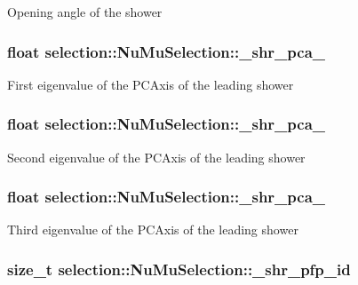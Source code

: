 Opening angle of the shower \hypertarget{classselection_1_1NuMuSelection_a60e7ec002826c7bc6f31739a1f06d67a}{
\subsubsection[{\-\_\-shr\-\_\-pca\-\_\-0}]{\setlength{\rightskip}{0pt plus 5cm}float selection\-::\-Nu\-Mu\-Selection\-::\-\_\-shr\-\_\-pca\-\_\hspace{0.3cm}{\ttfamily [private]}}}\label{classselection_1_1NuMuSelection_a60e7ec002826c7bc6f31739a1f06d67a}
First eigenvalue of the P\-C\-Axis of the leading shower \hypertarget{classselection_1_1NuMuSelection_a7b9ce353bdf801c126b949d2ababcdef}{
\subsubsection[{\-\_\-shr\-\_\-pca\-\_\-1}]{\setlength{\rightskip}{0pt plus 5cm}float selection\-::\-Nu\-Mu\-Selection\-::\-\_\-shr\-\_\-pca\-\_\hspace{0.3cm}{\ttfamily [private]}}}\label{classselection_1_1NuMuSelection_a7b9ce353bdf801c126b949d2ababcdef}
Second eigenvalue of the P\-C\-Axis of the leading shower \hypertarget{classselection_1_1NuMuSelection_af4069f6356b76cbfb2b2657e70961b63}{
\subsubsection[{\-\_\-shr\-\_\-pca\-\_\-2}]{\setlength{\rightskip}{0pt plus 5cm}float selection\-::\-Nu\-Mu\-Selection\-::\-\_\-shr\-\_\-pca\-\_\hspace{0.3cm}{\ttfamily [private]}}}\label{classselection_1_1NuMuSelection_af4069f6356b76cbfb2b2657e70961b63}
Third eigenvalue of the P\-C\-Axis of the leading shower \hypertarget{classselection_1_1NuMuSelection_a6a877911df0beda5d7d43149d0535389}{
\subsubsection[{\-\_\-shr\-\_\-pfp\-\_\-id}]{\setlength{\rightskip}{0pt plus 5cm}size\-\_\-t selection\-::\-Nu\-Mu\-Selection\-::\-\_\-shr\-\_\-pfp\-\_\-id\hspace{0.3cm}{\ttfamily [private]}}}\label{classselection_1_1NuMuSelection_a6a877911df0beda5d7d43149d0535389}
